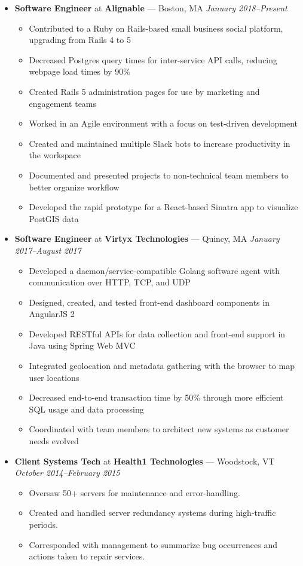 \documentclass{article}
\begin{document}
\begin{itemize}[label={},leftmargin=*]

\item \textbf{Software Engineer} at \textbf{Alignable} --- Boston, MA \hfill {\em January 2018--Present}
  \begin{itemize}[label={$\bullet$}]
  \item Contributed to a Ruby on Rails-based small business social platform, upgrading from Rails 4 to 5
  \item Decreased Postgres query times for inter-service API calls, reducing webpage load times by 90\%
  \item Created Rails 5 administration pages for use by marketing and engagement teams
  \item Worked in an Agile environment with a focus on test-driven development
  \item Created and maintained multiple Slack bots to increase productivity in the workspace
  \item Documented and presented projects to non-technical team members to better organize workflow
  \item Developed the rapid prototype for a React-based Sinatra app to visualize PostGIS data
  \end{itemize}

\item \textbf{Software Engineer} at \textbf{Virtyx Technologies} --- Quincy, MA \hfill {\em January 2017--August 2017}
  \begin{itemize}[label={$\bullet$}]
  \item Developed a daemon/service-compatible Golang software agent with communication over HTTP, TCP, and UDP
  \item Designed, created, and tested front-end dashboard components in AngularJS 2
  \item Developed RESTful APIs for data collection and front-end support in Java using Spring Web MVC
  \item Integrated geolocation and metadata gathering with the browser to map user locations
  \item Decreased end-to-end transaction time by 50\% through more efficient SQL usage and data processing
  \item Coordinated with team members to architect new systems as customer needs evolved
  \end{itemize}

\item \textbf{Client Systems Tech} at \textbf{Health1 Technologies} --- Woodstock, VT \hfill {\em October 2014--February 2015}
  \begin{itemize}[label={$\bullet$}]
  \item Oversaw 50+ servers for maintenance and error-handling.
  \item Created and handled server redundancy systems during high-traffic periods.
  \item Corresponded with management to summarize bug occurrences and actions taken to repair services.
  \end{itemize}


\end{itemize}
\end{document}
